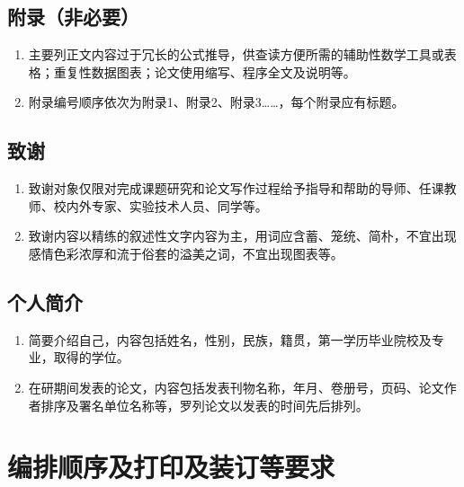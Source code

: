 \subsection{附录（非必要）}

\begin{enumerate}[label=\arabic*)]
	\item 主要列正文内容过于冗长的公式推导，供查读方便所需的辅助性数学工具或表格；重复性数据图表；论文使用缩写、程序全文及说明等。
	
	\item 附录编号顺序依次为附录1、附录2、附录3……，每个附录应有标题。
	
\end{enumerate}

\subsection{致谢}

\begin{enumerate}[label=\arabic*)]
	\item 致谢对象仅限对完成课题研究和论文写作过程给予指导和帮助的导师、任课教师、校内外专家、实验技术人员、同学等。
	
	\item 致谢内容以精练的叙述性文字内容为主，用词应含蓄、笼统、简朴，不宜出现感情色彩浓厚和流于俗套的溢美之词，不宜出现图表等。
	
\end{enumerate}

\subsection{个人简介}

\begin{enumerate}[label=\arabic*)]
	\item 简要介绍自己，内容包括姓名，性别，民族，籍贯，第一学历毕业院校及专业，取得的学位。
	
	\item 在研期间发表的论文，内容包括发表刊物名称，年月、卷册号，页码、论文作者排序及署名单位名称等，罗列论文以发表的时间先后排列。
	
\end{enumerate}


\section{编排顺序及打印及装订等要求}

